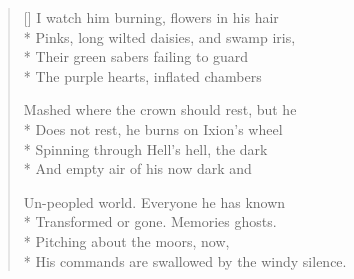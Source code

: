 \label{ch:lear_bg}
\settowidth{\versewidth}{His commands are swallowed by the windy silence.}
\begin{verse}[\versewidth]
 I watch him burning, flowers in his hair\\*
Pinks, long wilted daisies, and swamp iris,\\*
Their green sabers failing to guard\\*
The purple hearts, inflated chambers

Mashed where the crown should rest, but he\\*
Does not rest, he burns on Ixion's wheel\\*
Spinning through Hell's hell, the dark\\*
And empty air of his now dark and

Un-peopled world. Everyone he has known\\*
Transformed or gone. Memories ghosts.\\*
Pitching about the moors, now,\\*
His commands are swallowed by the windy silence.
\end{verse}
